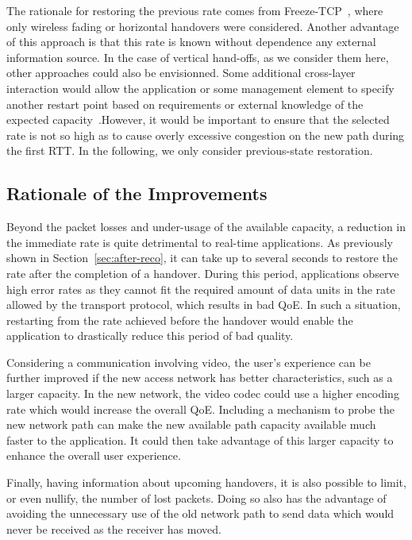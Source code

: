 \documentclass[twocolumn]{nictatechreport}
\newcommand{\latinlocution}[1]{\textit{#1}}
\newcommand{\eg}{\latinlocution{e.g.}}
\begin{document}
The rationale for restoring the previous rate comes from
Freeze-TCP~\cite{2000goff_freezetcp}, where only wireless fading or horizontal
handovers were considered. Another advantage of this approach is that this rate
is known without dependence any external information source. In the case of
vertical hand-offs, as we consider them here, other approaches could also be
envisionned.  Some additional cross-layer interaction would allow the
application or some management element to specify another restart point based on
requirements or external knowledge of the expected
capacity~\cite[\eg,][]{1999balakrishnan_integrated_congestion_control,2011mehani_multihomed_flow_management}.However, it would be important to ensure that the selected rate is not so high
as to cause overly excessive congestion on the new path during the first RTT.
In the following, we only consider previous-state restoration.

\subsection{Rationale of the Improvements}

Beyond the packet losses and under-usage of the available capacity, a reduction
in the immediate rate is quite detrimental to real-time applications. As
previously shown in Section~\ref{sec:after-reco}, it can take
up to several seconds to restore the rate after the completion of a handover.
During this period, applications observe high error rates as they cannot fit the
required amount of data units in the rate allowed by the transport protocol,
which results in bad QoE.  In such a situation, restarting from the rate
achieved before the handover would enable the application to drastically reduce
this period of bad quality.

Considering a communication involving video, the user's experience can be
further improved if the new access network has better characteristics, such as a
larger capacity. In the new network, the video codec could use a higher encoding
rate which would increase the overall QoE. Including a mechanism to probe the
new network path can make the new available path capacity available much faster
to the application. It could then take advantage of this larger capacity to
enhance the overall user experience.

Finally, having information about upcoming handovers, it is also possible to
limit, or even nullify, the number of lost packets. Doing so also has the
advantage of avoiding the unnecessary use of the old network path to send data
which would never be received as the receiver has moved.
\end{document}

